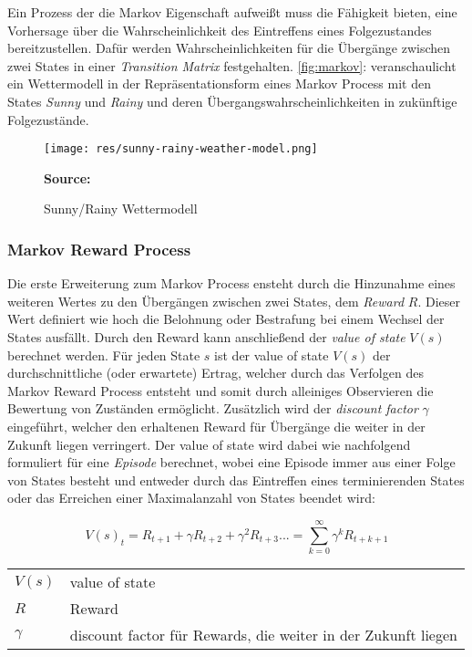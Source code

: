 \documentclass[11pt]{scrartcl}
\makeatletter
\newcommand{\source}[1]{\vspace{-5pt} \caption*{\hfill \textbf{Source:} {#1}} }
\newenvironment{conditions}
  {\par\vspace{\abovedisplayskip}\noindent\begin{tabular}{>{$}l<{$} @{${}:{}$} l}}
  {\end{tabular}\par\vspace{\belowdisplayskip}}
\makeatother
\begin{document}
Ein Prozess der die Markov Eigenschaft aufweißt muss die Fähigkeit bieten, eine Vorhersage über
die Wahrscheinlichkeit des Eintreffens eines Folgezustandes bereitzustellen. Dafür werden 
Wahrscheinlichkeiten für die Übergänge zwischen zwei States in einer \textit{Transition Matrix}
festgehalten. \autoref{fig:markov}:  veranschaulicht ein Wettermodell in 
der Repräsentationsform eines Markov Process mit den States \textit{Sunny} und \textit{Rainy}
und deren Übergangswahrscheinlichkeiten in zukünftige Folgezustände.

\begin{figure}[htp]
\centering
\texttt{[image: res/sunny-rainy-weather-model.png]}
\caption{Sunny/Rainy Wettermodell}
\source{\cite[~S.13 - Chapter 1 - Figure 4]{L2018}}
\label{fig:markov}
\end{figure}


\subsubsection{Markov Reward Process}
\label{sec:markov_reward_process}
Die erste Erweiterung zum Markov Process ensteht durch die Hinzunahme eines weiteren Wertes zu den 
Übergängen zwischen zwei States, dem \textit{Reward} $R$. Dieser Wert definiert wie hoch die Belohnung
oder Bestrafung bei einem Wechsel der States ausfällt. Durch den Reward kann anschließend der
\textit{value of state} $V(s)$ berechnet werden. Für jeden State $s$ ist der value of state $V(s)$
der durchschnittliche (oder erwartete) Ertrag, welcher durch das Verfolgen des Markov Reward Process
entsteht und somit durch alleiniges Observieren die Bewertung von Zuständen ermöglicht.
Zusätzlich wird der \textit{discount factor} $\gamma$ eingeführt, welcher den erhaltenen Reward
für Übergänge die weiter in der Zukunft liegen verringert. Der value of state wird dabei wie
nachfolgend formuliert für eine \textit{Episode} berechnet, wobei eine Episode immer aus einer
Folge von States besteht und entweder durch das Eintreffen eines terminierenden States oder das
Erreichen einer Maximalanzahl von States beendet wird:

\begin{equation}
V(s)_t = R_{t+1} + \gamma R_{t+2} + \gamma^2 R_{t+3} ... = \sum_{k=0}^\infty \gamma^{k} R_{t+k+1}
\label{eq:value-of-state}
\end{equation} 

\begin{conditions}
 V(s)     	&  value of state \\
 R	     	&  Reward \\   
 \gamma 	&  discount factor für Rewards, die weiter in der Zukunft liegen
\end{conditions}
\end{document}

